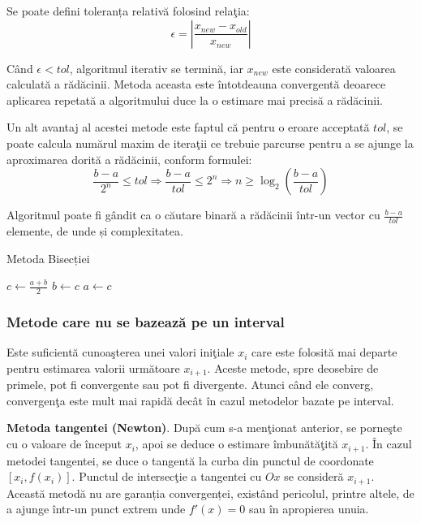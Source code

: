 \documentclass{exam}
\begin{document}
Se poate defini toleranța relativă folosind relaţia:
\begin{equation*}
	\epsilon = \left | \frac{x_{new}-x_{old}}{x_{new}} \right |
\end{equation*}

Când $\epsilon < tol$, algoritmul iterativ se termină, iar $x_{new}$ este
considerată valoarea calculată a rădăcinii. Metoda aceasta este întotdeauna
convergentă deoarece aplicarea repetată a algoritmului duce la o estimare mai
precisă a rădăcinii.

Un alt avantaj al acestei metode este faptul că pentru o eroare acceptată $tol$,
se poate calcula numărul maxim de iteraţii ce trebuie parcurse pentru a se
ajunge la aproximarea dorită a rădăcinii, conform formulei:
\begin{equation*}
	\frac{b-a}{2^n} \leq tol \Rightarrow \frac{b-a}{tol} \leq 2^n \Rightarrow n \geq \log_{2}(\frac{b-a}{tol})
\end{equation*}

Algoritmul poate fi gândit ca o căutare binară a rădăcinii într-un vector cu
$\frac{b-a}{tol}$ elemente, de unde și complexitatea.

\begin{algorithm}
	\caption{Metoda Bisecției}
	\begin{algorithmic}[1]
		\State $c \gets \frac{a + b}{2}$
		\State $b \gets c$
		\Else
		\State $a \gets c$
		\EndIf
		\EndWhile
	\end{algorithmic}
\end{algorithm}

\subsubsection{Metode care nu se bazează pe un interval}

Este suficientă cunoaşterea unei valori iniţiale $x_i$ care este folosită mai
departe pentru estimarea valorii următoare $x_{i+1}$. Aceste metode, spre
deosebire de primele, pot fi convergente sau pot fi divergente. Atunci când ele
converg, convergenţa este mult mai rapidă decât în cazul metodelor bazate pe
interval.

\textbf{Metoda tangentei (Newton)}. După cum s-a menţionat anterior, se porneşte
cu o valoare de început $x_{i}$, apoi se deduce o estimare îmbunătăţită
$x_{i+1}$. În cazul metodei tangentei, se duce o tangentă la curba din punctul
de coordonate $[x_{i}, f(x_{i})]$. Punctul de intersecţie a tangentei cu $Ox$ se
consideră  $x_{i+1}$. Această metodă nu are garanția convergenței,
existând pericolul, printre altele, de a ajunge într-un punct extrem unde
$f'(x) = 0$ sau în apropierea unuia.
\end{document}
